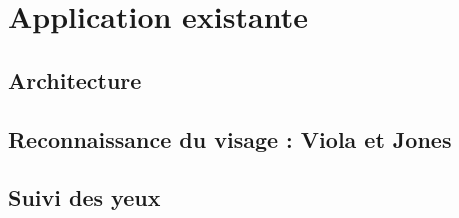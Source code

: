\section{Application existante}

\subsection{Architecture}

\subsection{Reconnaissance du visage : Viola et Jones}
% 

\subsection{Suivi des yeux}

